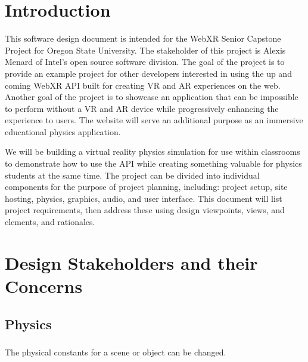 \documentclass[onecolumn, draftclsnofoot,10pt, compsoc]{IEEEtran}
\begin{document}
\section{Introduction}
This software design document is intended for the WebXR Senior Capstone Project for Oregon State University. The stakeholder of this project is Alexis Menard of Intel's open source software division. The goal of the project is to provide an example project for other developers interested in using the up and coming WebXR API built for creating VR and AR experiences on the web. Another goal of the project is to showcase an application that can be impossible to perform without a VR and AR device while progressively enhancing the experience to users. The website will serve an additional purpose as an immersive educational physics application.

We will be building a virtual reality physics simulation for use within classrooms to demonstrate how to use the API while creating something valuable for physics students at the same time. The project can be divided into individual components for the purpose of project planning, including: project setup, site hosting, physics, graphics, audio, and user interface. This document will list project requirements, then address these using design viewpoints, views, and elements, and rationales. 

\section{Design Stakeholders and their Concerns}

\subsection{Physics}
\subsubsection{}
The physical constants for a scene or object can be changed.
\end{document}
